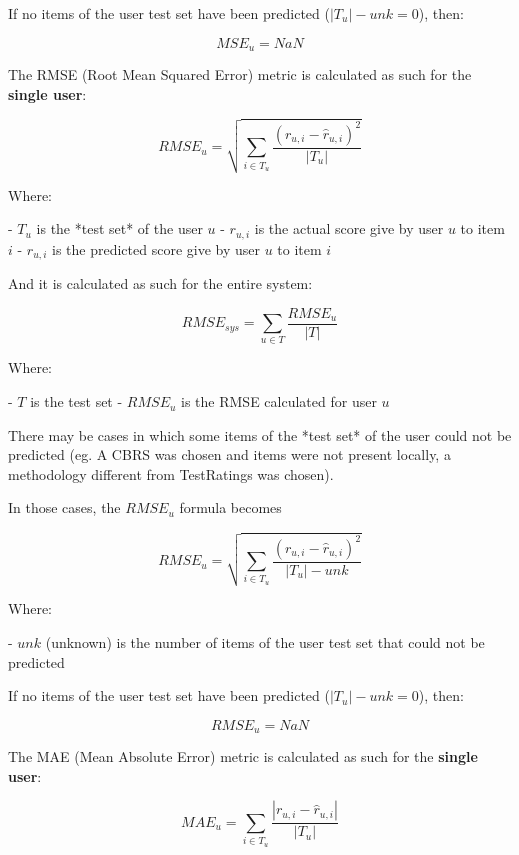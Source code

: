 \documentclass[11pt]{article}
\begin{document}
If no items of the user test set have been predicted ($|T_u| - unk = 0$), then:

    \[
    MSE_u = NaN
    \]

\hfill\break


The RMSE (Root Mean Squared Error) metric is calculated as such for the \textbf{single user}:

    \[
    RMSE_u = \sqrt{\sum_{i \in T_u} \frac{(r_{u,i} - \hat{r}_{u,i})^2}{|T_u|}}
    \]

    Where:

    - $T_u$ is the *test set* of the user $u$
    - $r_{u, i}$ is the actual score give by user $u$ to item $i$
    - $\hat{r}_{u, i}$ is the predicted score give by user $u$ to item $i$

\hfill\break

And it is calculated as such for the entire system:

    \[
    RMSE_{sys} = \sum_{u \in T} \frac{RMSE_u}{|T|}
    \]

    Where:

    - $T$ is the test set
    - $RMSE_u$ is the RMSE calculated for user $u$

\hfill\break

There may be cases in which some items of the *test set* of the user could not be predicted (eg. A CBRS was chosen
and items were not present locally, a methodology different from TestRatings was chosen).

In those cases, the $RMSE_u$ formula becomes

    \[
    RMSE_u = \sqrt{\sum_{i \in T_u} \frac{(r_{u,i} - \hat{r}_{u,i})^2}{|T_u| - unk}}
    \]

    Where:

    - $unk$ (unknown) is the number of items of the user test set that could not be predicted

    If no items of the user test set have been predicted ($|T_u| - unk = 0$), then:

    \[
    RMSE_u = NaN
    \]

\hfill\break



The MAE (Mean Absolute Error) metric is calculated as such for the \textbf{single user}:

    \[
    MAE_u = \sum_{i \in T_u} \frac{|r_{u,i} - \hat{r}_{u,i}|}{|T_u|}
    \]
\end{document}
